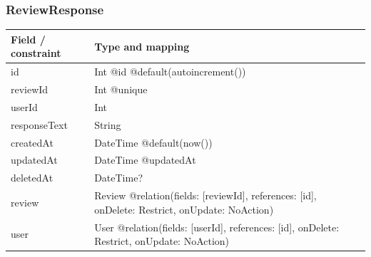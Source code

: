 \subsubsection{ReviewResponse}
\begin{longtable}{|L{3.3cm}|L{10.8cm}|}\hline
Field / constraint & Type and mapping \\ \hline
id & Int @id @default(autoincrement()) \\ \hline
reviewId & Int @unique \\ \hline
userId & Int \\ \hline
responseText & String \\ \hline
createdAt & DateTime @default(now()) \\ \hline
updatedAt & DateTime @updatedAt \\ \hline
deletedAt & DateTime? \\ \hline
review & Review @relation(fields: [reviewId], references: [id], onDelete: Restrict, onUpdate: NoAction) \\ \hline
user & User @relation(fields: [userId], references: [id], onDelete: Restrict, onUpdate: NoAction) \\ \hline
\end{longtable}
